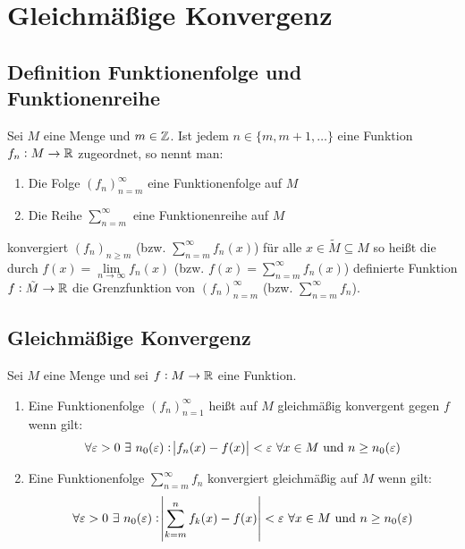 \section{Gleichmäßige Konvergenz}
\subsection{Definition Funktionenfolge und Funktionenreihe}
Sei $M$ eine Menge und $m \in \mathbb{Z}$. Ist jedem $n \in \{m, m+1, \ldots\}$ eine
Funktion $f_n: M \rightarrow \mathbb{R}$ zugeordnet, so nennt man:
\begin{enumerate}[label= (\alph*)]
    \item Die Folge ${(f_n)}_{n=m}^\infty$ eine Funktionenfolge auf $M$
    \item Die Reihe $\sum_{n=m}^\infty$ eine Funktionenreihe auf $M$
\end{enumerate}

konvergiert ${(f_n)}_{n \geq m}$ (bzw. $\sum_{n=m}^\infty f_n(x)$) für alle
$x \in \tilde{M} \subseteq M$ so heißt die durch $f(x) = \lim\limits_{n \rightarrow \infty}
f_n(x)$ (bzw. $f(x) = \sum_{n=m}^\infty f_n(x)$) definierte Funktion $f:
\tilde{M} \rightarrow \mathbb{R}$ die Grenzfunktion von ${(f_n)}_{n=m}^\infty$
(bzw. $\sum_{n=m}^\infty f_n$).

\subsection{Gleichmäßige Konvergenz}
Sei $M$ eine Menge und sei $f: M \rightarrow \mathbb{R}$ eine Funktion.
\begin{enumerate}[label= (\alph*)]
    \item Eine Funktionenfolge ${(f_n)}_{n=1}^\infty$ heißt auf $M$ gleichmäßig
        konvergent gegen $f$ wenn gilt:
        \begin{equation*}
            \forall \varepsilon > 0\  \exists\ n_0(\varepsilon):
                \abs{f_n(x) - f(x)} < \varepsilon\
                \forall x \in M \text{ und } n \geq n_0(\varepsilon)
        \end{equation*}
    \item Eine Funktionenfolge $\sum_{n=m}^\infty f_n$ konvergiert gleichmäßig
        auf $M$ wenn gilt:
            \begin{equation*}
                \forall \varepsilon > 0\ \exists\ n_0(\varepsilon): \abs{\sum_{k=m}^n f_k(x) - f(x)}
                    < \varepsilon\ \forall x \in M \text{ und } n \geq n_0(\varepsilon)
            \end{equation*}
\end{enumerate}


